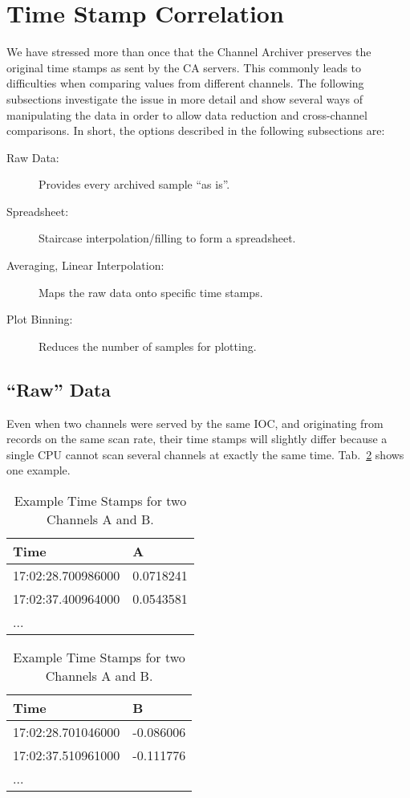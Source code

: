 \section{Time Stamp Correlation} \label{sec:timestampcorr}
We have stressed more than once that the Channel Archiver preserves
the original time stamps as sent by the CA servers.  This commonly
leads to difficulties when comparing values from different
channels. The following subsections investigate the issue in more
detail and show several ways of manipulating the data in order to
allow data reduction and cross-channel comparisons.
In short, the options described in the following subsections are:
\begin{description}
\item[\sffamily Raw Data:]
  Provides every archived sample ``as is''.
\item[\sffamily Spreadsheet:]
  Staircase interpolation/filling to form a spreadsheet.
\item[\sffamily Averaging, Linear Interpolation:]
  Maps the raw data onto specific time stamps.
\item[\sffamily Plot Binning:]
  Reduces the number of samples for plotting.
\end{description}

\subsection{``Raw'' Data} \label{sec:rawdata}
Even when two channels were served by the same IOC, and originating from
records on the same scan rate, their time stamps will slightly differ
because a single CPU cannot scan several channels at exactly the same
time.  Tab.~\ref{tab:ABtimes} shows one example.

\begin{table}[htbp]
  \begin{center}
    \begin{minipage}[t]{0.49\textwidth}
      \sffamily
      \begin{tabular}[t]{l|l}
        Time               & A         \\
        \hline
        17:02:28.700986000 & 0.0718241 \\
        17:02:37.400964000 & 0.0543581 \\
        ...
      \end{tabular}
    \end{minipage}%
    \begin{minipage}[t]{0.49\textwidth}
      \sffamily
      \begin{tabular}[t]{l|l}
        Time               & B         \\
        \hline
        17:02:28.701046000 & -0.086006 \\
        17:02:37.510961000 & -0.111776 \\
        ...
      \end{tabular}
    \end{minipage}%
    \caption{Example Time Stamps for two Channels A and B.}
    \label{tab:ABtimes}
  \end{center}
\end{table}

